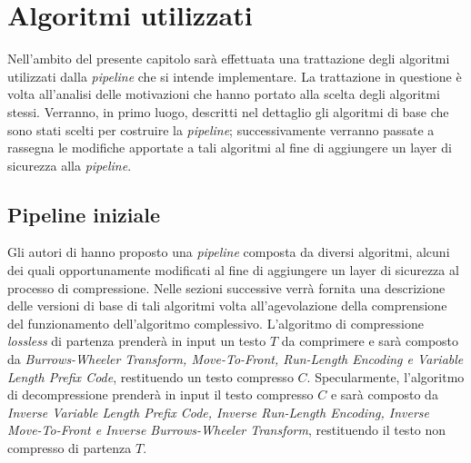 \chapter{Algoritmi utilizzati} %
%
\begin{citazione}
Nell'ambito del presente capitolo sarà effettuata una trattazione degli algoritmi utilizzati dalla \emph{pipeline} che si intende implementare. La trattazione in questione è volta all'analisi delle motivazioni che hanno portato alla scelta degli algoritmi stessi. Verranno, in primo luogo, descritti nel dettaglio gli algoritmi di base che sono stati scelti per costruire la \emph{pipeline}; successivamente verranno passate a rassegna le modifiche apportate a tali algoritmi al fine di aggiungere un layer di sicurezza alla \emph{pipeline}. 
\end{citazione}
\newpage

\section{Pipeline iniziale}
Gli autori di \cite{zeng2018secure} hanno proposto una \emph{pipeline} composta da diversi algoritmi, alcuni dei quali opportunamente modificati al fine di aggiungere un layer di sicurezza al processo di compressione. Nelle sezioni successive verrà fornita una descrizione delle versioni di base di tali algoritmi volta all'agevolazione della comprensione del funzionamento dell'algoritmo complessivo. L'algoritmo di compressione \emph{lossless} di partenza prenderà in input un testo $T$ da comprimere e sarà composto da \emph{Burrows-Wheeler Transform, Move-To-Front, Run-Length Encoding e Variable Length Prefix Code}, restituendo un testo compresso $C$. Specularmente, l'algoritmo di decompressione prenderà in input il testo compresso $C$ e sarà composto da \emph{Inverse Variable Length Prefix Code, Inverse Run-Length Encoding, Inverse Move-To-Front e Inverse Burrows-Wheeler Transform}, restituendo il testo non compresso di partenza $T$.
